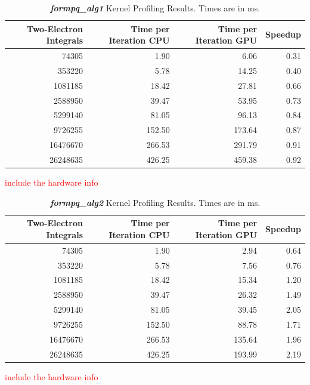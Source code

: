 \documentclass[12pt]{report}
\newcommand{\notetodylan}[1]{\textcolor{red}{#1}} %
\newcommand{\kernel}[1]{\textit{\textbf{#1}}}
\begin{document}
\begin{table}[h!]
\begin{center}
\caption[\kernel{formpq\_alg1} Kernel Profiling Results.]{\kernel{formpq\_alg1} Kernel Profiling Results. Times are in ms.}
\label{tab:PQprofalg1}
\begin{tabular}{rrrr}
\toprule
	Two-Electron Integrals	&	Time per Iteration CPU	&	Time per Iteration GPU	&	Speedup	\\
\midrule
	74305	&	1.90		&	6.06		&	0.31		\\
	353220	&	5.78		&	14.25	&	0.40		\\
	1081185	&	18.42	&	27.81	&	0.66		\\
	2588950	&	39.47	&	53.95	&	0.73		\\
	5299140	&	81.05	&	96.13	&	0.84		\\
	9726255	&	152.50	&	173.64	&	0.87		\\
	16476670	&	266.53	&	291.79	&	0.91		\\
	26248635	&	426.25	&	459.38	&	0.92		\\
\bottomrule
\end{tabular}
\end{center}
\notetodylan{include the hardware info}
\end{table}

\begin{table}[h!]
\begin{center}
\caption[\kernel{formpq\_alg2} Kernel Profiling Results.]{\kernel{formpq\_alg2} Kernel Profiling Results. Times are in ms.}
\label{tab:PQprofalg2}
\begin{tabular}{rrrr}
\toprule
	Two-Electron Integrals	&	Time per Iteration CPU		&	Time per Iteration GPU	&	Speedup	\\
\midrule
	74305	&	1.90		&	2.94		&	0.64	\\
	353220	&	5.78		&	7.56		&	0.76	\\
	1081185	&	18.42	&	15.34	&	1.20	\\
	2588950	&	39.47	&	26.32	&	1.49	\\
	5299140	&	81.05	&	39.45	&	2.05	\\
	9726255	&	152.50	&	88.78	&	1.71	\\
	16476670	&	266.53	&	135.64	&	1.96	\\
	26248635	&	426.25	&	193.99	&	2.19	\\
\bottomrule
\end{tabular}
\end{center}
\notetodylan{include the hardware info}
\end{table}
\end{document}
